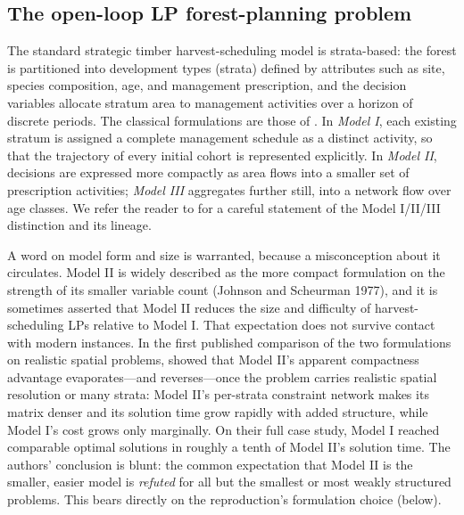 \hypertarget{the-open-loop-lp-forest-planning-problem}{%
\subsection{The open-loop LP forest-planning problem}\label{the-open-loop-lp-forest-planning-problem}}

The standard strategic timber harvest-scheduling model is strata-based: the forest is partitioned into development types (strata) defined by attributes such as site, species composition, age, and management prescription, and the decision variables allocate stratum area to management activities over a horizon of discrete periods. The classical formulations are those of \citet{johnson1977techniques}. In \emph{Model I}, each existing stratum is assigned a complete management schedule as a distinct activity, so that the trajectory of every initial cohort is represented explicitly. In \emph{Model II}, decisions are expressed more compactly as area flows into a smaller set of prescription activities; \emph{Model III} aggregates further still, into a network flow over age classes. We refer the reader to \citep[ch.~16]{gunn2007models} for a careful statement of the Model I/II/III distinction and its lineage.

A word on model form and size is warranted, because a misconception about it circulates. Model II is widely described as the more compact formulation on the strength of its smaller variable count (Johnson and Scheurman 1977), and it is sometimes asserted that Model II reduces the size and difficulty of harvest-scheduling LPs relative to Model I. That expectation does not survive contact with modern instances. In the first published comparison of the two formulations on realistic spatial problems, \citet{martin2017comparing} showed that Model II's apparent compactness advantage evaporates---and reverses---once the problem carries realistic spatial resolution or many strata: Model II's per-strata constraint network makes its matrix denser and its solution time grow rapidly with added structure, while Model I's cost grows only marginally. On their full case study, Model I reached comparable optimal solutions in roughly a tenth of Model II's solution time. The authors' conclusion is blunt: the common expectation that Model II is the smaller, easier model is \emph{refuted} for all but the smallest or most weakly structured problems. This bears directly on the reproduction's formulation choice (below).

